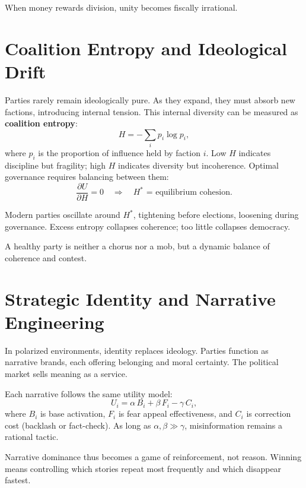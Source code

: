 \documentclass[12pt,twoside]{book}
\begin{document}
\begin{keyidea}
When money rewards division, unity becomes fiscally irrational.
\end{keyidea}

\section{Coalition Entropy and Ideological Drift}

Parties rarely remain ideologically pure.  
As they expand, they must absorb new factions, introducing internal tension.  
This internal diversity can be measured as \textbf{coalition entropy}:
\[
H = -\sum_i p_i \log p_i,
\]
where $p_i$ is the proportion of influence held by faction $i$.  
Low $H$ indicates discipline but fragility; high $H$ indicates diversity but incoherence.  
Optimal governance requires balancing between them:
\[
\frac{\partial U}{\partial H} = 0 \quad \Rightarrow \quad H^* \text{ = equilibrium cohesion.}
\]

Modern parties oscillate around $H^*$, tightening before elections, loosening during governance.  
Excess entropy collapses coherence; too little collapses democracy.\\

\begin{keyidea}
A healthy party is neither a chorus nor a mob, but a dynamic balance of coherence and contest.
\end{keyidea}

\section{Strategic Identity and Narrative Engineering}

In polarized environments, identity replaces ideology.  
Parties function as narrative brands, each offering belonging and moral certainty.  
The political market sells meaning as a service.  

Each narrative follows the same utility model:
\[
U_i = \alpha \,B_i + \beta \,F_i - \gamma \,C_i,
\]
where $B_i$ is base activation, $F_i$ is fear appeal effectiveness, and $C_i$ is correction cost (backlash or fact-check).  
As long as $\alpha,\beta \gg \gamma$, misinformation remains a rational tactic.  

Narrative dominance thus becomes a game of reinforcement, not reason.  
Winning means controlling which stories repeat most frequently and which disappear fastest.\\
\end{document}

